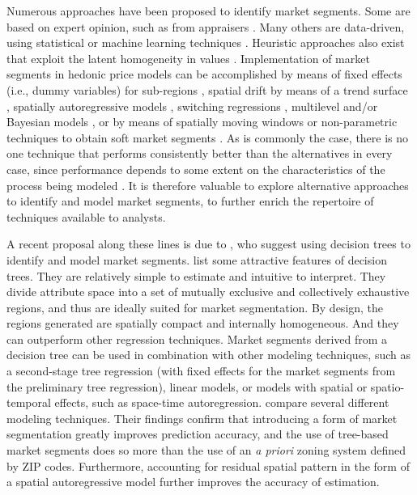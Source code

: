 \documentclass[Royal,times,sageh]{sagej}
\begin{document}
Numerous approaches have been proposed to identify market segments. Some
are based on expert opinion, such as from appraisers
\citep{Wheeler2014bayesian}. Many others are data-driven, using
statistical or machine learning techniques
\citep[e.g.,][]{Helbich2013data, Wu2018modified}. Heuristic approaches
also exist that exploit the latent homogeneity in values
\citep{Royuela2013heuristic}. Implementation of market segments in
hedonic price models can be accomplished by means of fixed effects
(i.e., dummy variables) for sub-regions
\citep[e.g.,][]{Bourassa2007spatial}, spatial drift by means of a trend
surface \citep[e.g.][]{Pace1997spatial}, spatially autoregressive models
\citep[e.g.,][]{Pace1998spatiotemporal}, switching regressions
\citep[e.g.,][]{Islam2011addressing, Paez2001spatial}, multilevel and/or
Bayesian models \citep[e.g.,][]{Wheeler2014bayesian}, or by means of
spatially moving windows or non-parametric techniques to obtain soft
market segments \citep{Paez2008moving, Hwang2009delineating}. As is
commonly the case, there is no one technique that performs consistently
better than the alternatives in every case, since performance depends to
some extent on the characteristics of the process being modeled
\citep{Usman2020property}. It is therefore valuable to explore
alternative approaches to identify and model market segments, to further
enrich the repertoire of techniques available to analysts.

A recent proposal along these lines is due to \citet{Fuss2016role}, who
suggest using decision trees to identify and model market segments.
\citet{James2013introduction} list some attractive features of decision
trees. They are relatively simple to estimate and intuitive to
interpret. They divide attribute space into a set of mutually exclusive
and collectively exhaustive regions, and thus are ideally suited for
market segmentation. By design, the regions generated are spatially
compact and internally homogeneous. And they can outperform other
regression techniques. Market segments derived from a decision tree can
be used in combination with other modeling techniques, such as a
second-stage tree regression (with fixed effects for the market segments
from the preliminary tree regression), linear models, or models with
spatial or spatio-temporal effects, such as space-time autoregression.
\citet{Fuss2016role} compare several different modeling techniques.
Their findings confirm that introducing a form of market segmentation
greatly improves prediction accuracy, and the use of tree-based market
segments does so more than the use of an \emph{a priori} zoning system
defined by ZIP codes. Furthermore, accounting for residual spatial
pattern in the form of a spatial autoregressive model further improves
the accuracy of estimation.
\end{document}

